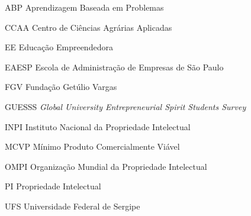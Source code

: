 
\begin{siglas}
    
\item[ABP]{ Aprendizagem Baseada em Problemas}
\item[CCAA]{Centro de Ciências Agrárias Aplicadas}
\item[EE]{Educação Empreendedora}
\item[EAESP]{Escola de Administração de Empresas de São Paulo}
\item[FGV]{Fundação Getúlio Vargas}
\item[GUESSS]{\textit{Global University Entrepreneurial Spirit Students Survey}}
\item[INPI]{Instituto Nacional da Propriedade Intelectual}
\item[MCVP]{Mínimo Produto Comercialmente Viável}
\item[OMPI]{Organização Mundial da Propriedade Intelectual}
\item[PI]{Propriedade Intelectual}
 \item[UFS]{Universidade Federal de Sergipe}
 	


\end{siglas}
